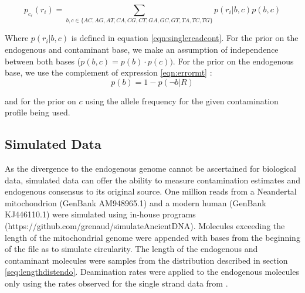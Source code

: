 \documentclass[a4paper,12pt]{article}
\begin{document}
\begin{itemize}
\begin{itemize}
\begin{equation}
p_{c_r}(r_i) = \sum\limits_{ b,c \in \{AC,AG,AT,CA,CG,CT,GA,GC,GT,TA,TC,TG\} } p(r_i|b,c) p(b,c)
\end{equation}

\noindent Where $p(r_i|b,c)$ is defined in equation \ref{eqn:singlereadcont}. For the prior on the endogenous and contaminant base, we make an assumption of independence between both bases ($p(b,c) = p(b) \cdot p(c))$. For the prior on the endogenous base, we use the complement of expression \ref{eqn:errormt} :
\begin{equation}
p(b)  = 1 - p(\neg b|R)
\end{equation}

\noindent  and for the prior on $c$ using the allele frequency for the given contamination profile being used. 





\subsection{Simulated Data}
\label{sec:meth:simulated}

As the divergence to the endogenous genome cannot be ascertained for biological data, simulated data can offer the ability to measure contamination estimates and endogenous consensus to its original source. One million reads from a Neandertal mitochondrion (GenBank AM948965.1) and a modern human (GenBank KJ446110.1) were simulated using in-house programs (https://github.com/grenaud/simulateAncientDNA). Molecules exceeding the length of the mitochondrial genome were appended with bases from the beginning of the file as to simulate circularity. The length of the endogenous and contaminant molecules were samples from the distribution described in section \ref{seq:lengthdistendo}. Deamination rates were applied to the endogenous molecules only using the rates observed for the single strand data from \cite{lazaridis2014ancient}. %


\end{itemize}
\end{itemize}
\end{document}
